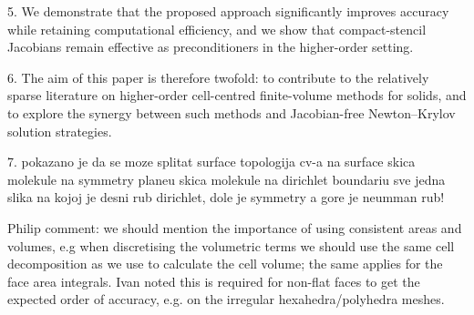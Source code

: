 \documentclass[sn-mathphys,Numbered]{sn-jnl}%
\begin{document}
	5.	We demonstrate that the proposed approach significantly improves accuracy while retaining computational efficiency, and we show that compact-stencil Jacobians remain effective as preconditioners in the higher-order setting.

	6.	The aim of this paper is therefore twofold: to contribute to the relatively sparse literature on higher-order cell-centred finite-volume methods for solids, and to explore the synergy between such methods and Jacobian-free Newton–Krylov solution strategies.
	
	7. pokazano je da se moze splitat surface topologija cv-a na surface
	skica molekule na symmetry planeu
skica molekule na dirichlet boundariu
sve jedna slika na kojoj je desni rub dirichlet, dole je symmetry a gore je neumman rub!

Philip comment: we should mention the importance of using consistent areas and
volumes, e.g when discretising the volumetric terms we should use the same cell
decomposition as we use to calculate the cell volume; the same applies for the
face area integrals. Ivan noted this is required for non-flat faces to get the
expected order of accuracy, e.g. on the irregular hexahedra/polyhedra meshes.

%
%      
\end{document}
